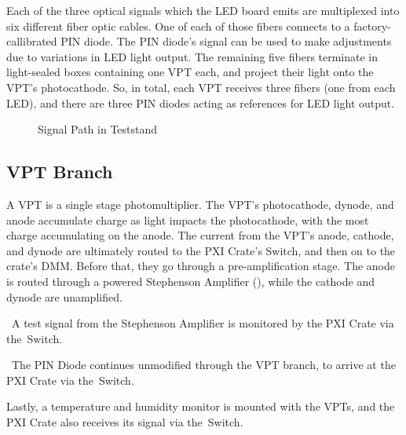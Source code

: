 Each of the three optical signals which the LED board emits are multiplexed into six different fiber optic cables.  One of each of those fibers connects to a factory-callibrated PIN diode.  The PIN diode's signal can be used to make adjustments due to variations in LED light output.  The remaining five fibers terminate in light-sealed boxes containing one VPT each, and project their light onto the VPT's photocathode.  So, in total, each VPT receives three fibers (one from each LED), and there are three PIN diodes acting as references for LED light output.

\begin{figure}[htbp]
  \centering
  
  \caption{Signal Path in Teststand}
  \label{fig:eq_intro:signal}
\end{figure}


\subsection{VPT Branch}
\label{sec:eq_intro:vpt_branch}
A VPT is a single stage photomultiplier.  The VPT's photocathode, dynode, and anode accumulate charge as light impacts the photocathode, with the most charge accumulating on the anode.  The current from the VPT's anode, cathode, and dynode are ultimately routed to the PXI Crate's Switch, and then on to the crate's DMM.  Before that, they go through a pre-amplification stage.  The anode is routed through a powered Stephenson Amplifier (), while the cathode and dynode are \FIXME{} unamplified.

\FIXME\ A test signal from the Stephenson Amplifier is monitored by the PXI Crate via the\ Switch.

\FIXME\ The PIN Diode continues unmodified through the VPT branch, to arrive at the PXI Crate via the\ Switch.

Lastly, a temperature and humidity monitor is mounted with the VPTs, and the PXI Crate also receives its signal via the\ Switch.








